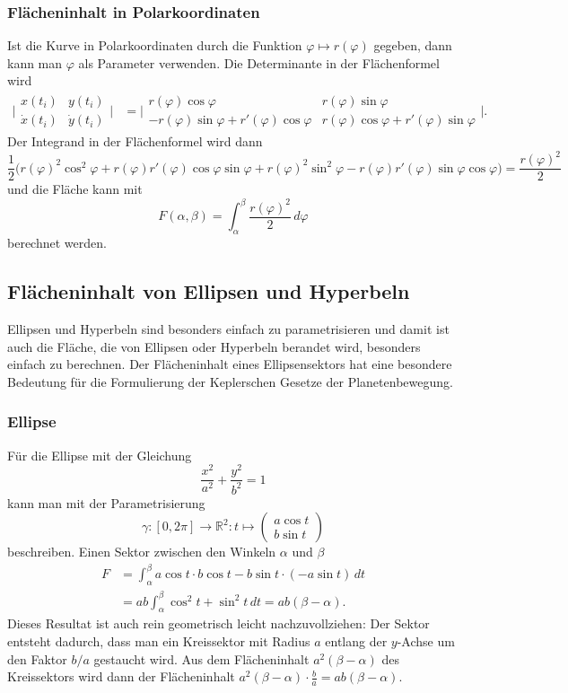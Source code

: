 \subsubsection{Flächeninhalt in Polarkoordinaten}
Ist die Kurve in Polarkoordinaten durch die Funktion
$\varphi\mapsto r(\varphi)$ gegeben, dann kann man $\varphi$ als
Parameter verwenden.
Die Determinante in der Flächenformel wird
\begin{align*}
\biggl|
\begin{matrix}
x(t_i)& y(t_i)\\
\dot{x}(t_i)& \dot{y}(t_i)
\end{matrix}
\biggr|
&=
\biggl|
\begin{matrix}
r(\varphi)\cos\varphi&r(\varphi)\sin\varphi\\
-r(\varphi)\sin\varphi+r'(\varphi)\cos\varphi
	&r(\varphi)\cos\varphi+r'(\varphi)\sin\varphi
\end{matrix}
\biggr|.
\end{align*}
Der Integrand in der Flächenformel wird dann
\[
\frac12\bigl(
r(\varphi)^2 \cos^2\varphi +r(\varphi)r'(\varphi)\cos\varphi\sin\varphi
+
r(\varphi)^2 \sin^2\varphi -r(\varphi)r'(\varphi)\sin\varphi\cos\varphi
\bigr)
=
\frac{r(\varphi)^2}2
\]
und die Fläche kann mit
\[
F(\alpha,\beta)=\int_\alpha^\beta \frac{r(\varphi)^2}{2}\,d\varphi
\]
berechnet werden.

\subsection{Flächeninhalt von Ellipsen und Hyperbeln}
Ellipsen und Hyperbeln sind besonders einfach zu parametrisieren und
damit ist auch die Fläche, die von Ellipsen oder Hyperbeln berandet
wird, besonders einfach zu berechnen.
Der Flächeninhalt eines Ellipsensektors hat eine besondere Bedeutung
für die Formulierung der Keplerschen Gesetze der Planetenbewegung.

\subsubsection{Ellipse}
Für die Ellipse mit der Gleichung
\[
\frac{x^2}{a^2}+\frac{y^2}{b^2}=1
\]
kann man mit der Parametrisierung
\[
\gamma\colon
[0,2\pi] \to \mathbb{R}^2
:
t \mapsto \begin{pmatrix}a\cos t\\ b\sin t\end{pmatrix}
\]
beschreiben.
Einen Sektor zwischen den Winkeln $\alpha$ und $\beta$
\begin{align*}
F
&=
\int_\alpha^\beta a\cos t \cdot b\cos t-b\sin t\cdot (-a\sin t)\,dt
\\
&=
ab
\int_\alpha^\beta \cos^2 t + \sin^2 t\,dt
=ab(\beta-\alpha).
\end{align*}
Dieses Resultat ist auch rein geometrisch leicht nachzuvollziehen:
Der Sektor entsteht dadurch, dass man ein Kreissektor mit Radius $a$
entlang der $y$-Achse um den Faktor $b/a$ gestaucht wird.
Aus dem Flächeninhalt $a^2(\beta-\alpha)$ des Kreissektors wird dann
der Flächeninhalt $a^2(\beta-\alpha)\cdot \frac{b}{a}=ab(\beta-\alpha)$.

